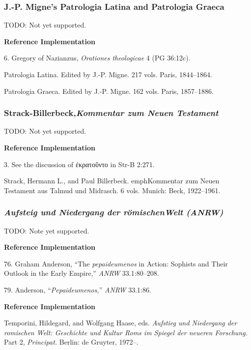 \documentclass[a4paper]{article}
\newcommand{\gr}[1]{{\greekfont #1}}
\newenvironment{refimp}{%
  \begin{minipage}{\linewidth}
    \setlength{\parskip}{1ex}
    \textbf{Reference Implementation}\par
    \nobreak
    \color{reference-colour}
}{\end{minipage}}
\begin{document}
\subsubsection{J.-P. Migne's Patrologia Latina and Patrologia Graeca}

TODO: Not yet supported.

\begin{refimp}
  6. Gregory of Nazianzus, \emph{Orationes theologicae} 4 (PG 36:12c).

  \hangindent\bibindent Patrologia Latina. Edited by J.-P. Migne. 217 vols.
  Paris, 1844–1864.

  \hangindent\bibindent Patrologia Graeca. Edited by J.-P. Migne. 162 vols.
  Paris, 1857–1886.
\end{refimp}

\subsubsection{Strack-Billerbeck,\newline\emph{Kommentar zum Neuen Testament}}

TODO: Not yet supported.

\begin{refimp}
  3. See the discussion of \gr{ἐκρατοῦντο} in Str-B 2:271.

  \hangindent\bibindent Strack, Hermann L., and Paul Billerbeck.
  emph{Kommentar zum Neuen Testament aus Talmud und Midrasch.} 6 vols. Munich:
  Beck, 1922–1961.
\end{refimp}

\subsubsection{\emph{Aufsteig und Niedergang der römischen\newline Welt (ANRW)}}

TODO: Note yet supported.

\begin{refimp}
  76. Graham Anderson, “The \emph{pepaideumenos} in Action: Sophists and Their
  Outlook in the Early Empire,” \emph{ANRW} 33.1:80–208.

  79. Anderson, “\emph{Pepaideumenos,}” \emph{ANRW} 33.1:86.
\end{refimp}

\begin{refimp}
  \hangindent\bibindent Temporini, Hildegard, and Wolfgang Haase, eds.
  \emph{Aufstieg und Niedergang der romischen Welt: Geschichte und Kultur Roms
  im Spiegel der neueren Forschung.} Part 2, \emph{Principat.} Berlin: de
  Gruyter, 1972–.
\end{refimp}
\end{document}
